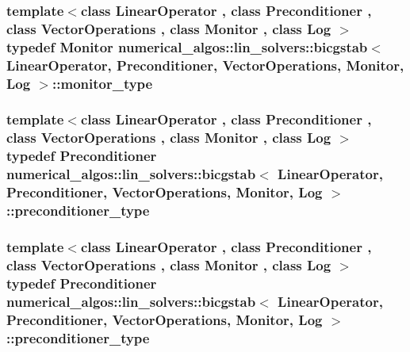 \hypertarget{classnumerical__algos_1_1lin__solvers_1_1bicgstab_a5837507942b23f73613452c79032b795}{
\subsubsection[{monitor\-\_\-type}]{\setlength{\rightskip}{0pt plus 5cm}template$<$class Linear\-Operator , class Preconditioner , class Vector\-Operations , class Monitor , class Log $>$ typedef Monitor {\bf numerical\-\_\-algos\-::lin\-\_\-solvers\-::bicgstab}$<$ Linear\-Operator, Preconditioner, Vector\-Operations, Monitor, Log $>$\-::{\bf monitor\-\_\-type}}}\label{classnumerical__algos_1_1lin__solvers_1_1bicgstab_a5837507942b23f73613452c79032b795}
\hypertarget{classnumerical__algos_1_1lin__solvers_1_1bicgstab_a70df69cdff2a33dea49471b873ca91af}{
\subsubsection[{preconditioner\-\_\-type}]{\setlength{\rightskip}{0pt plus 5cm}template$<$class Linear\-Operator , class Preconditioner , class Vector\-Operations , class Monitor , class Log $>$ typedef Preconditioner {\bf numerical\-\_\-algos\-::lin\-\_\-solvers\-::bicgstab}$<$ Linear\-Operator, Preconditioner, Vector\-Operations, Monitor, Log $>$\-::{\bf preconditioner\-\_\-type}}}\label{classnumerical__algos_1_1lin__solvers_1_1bicgstab_a70df69cdff2a33dea49471b873ca91af}
\hypertarget{classnumerical__algos_1_1lin__solvers_1_1bicgstab_a70df69cdff2a33dea49471b873ca91af}{
\subsubsection[{preconditioner\-\_\-type}]{\setlength{\rightskip}{0pt plus 5cm}template$<$class Linear\-Operator , class Preconditioner , class Vector\-Operations , class Monitor , class Log $>$ typedef Preconditioner {\bf numerical\-\_\-algos\-::lin\-\_\-solvers\-::bicgstab}$<$ Linear\-Operator, Preconditioner, Vector\-Operations, Monitor, Log $>$\-::{\bf preconditioner\-\_\-type}}}\label{classnumerical__algos_1_1lin__solvers_1_1bicgstab_a70df69cdff2a33dea49471b873ca91af}
